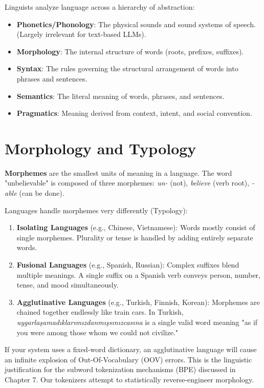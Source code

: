 Linguists analyze language across a hierarchy of abstraction:
\begin{itemize}
    \item \textbf{Phonetics/Phonology}: The physical sounds and sound systems of speech. (Largely irrelevant for text-based LLMs).
    \item \textbf{Morphology}: The internal structure of words (roots, prefixes, suffixes).
    \item \textbf{Syntax}: The rules governing the structural arrangement of words into phrases and sentences.
    \item \textbf{Semantics}: The literal meaning of words, phrases, and sentences.
    \item \textbf{Pragmatics}: Meaning derived from context, intent, and social convention.
\end{itemize}

\section{Morphology and Typology}
\label{ch:05:sec:main}

\textbf{Morphemes} are the smallest units of meaning in a language. The word "unbelievable" is composed of three morphemes: \textit{un-} (not), \textit{believe} (verb root), \textit{-able} (can be done). 

Languages handle morphemes very differently (Typology):
\begin{enumerate}
    \item \textbf{Isolating Languages} (e.g., Chinese, Vietnamese): Words mostly consist of single morphemes. Plurality or tense is handled by adding entirely separate words.
    \item \textbf{Fusional Languages} (e.g., Spanish, Russian): Complex suffixes blend multiple meanings. A single suffix on a Spanish verb conveys person, number, tense, and mood simultaneously.
    \item \textbf{Agglutinative Languages} (e.g., Turkish, Finnish, Korean): Morphemes are chained together endlessly like train cars. In Turkish, \textit{uygarlaşamadıklarımızdanmışsınızcasına} is a single valid word meaning "as if you were among those whom we could not civilize."
\end{enumerate}

If your system uses a fixed-word dictionary, an agglutinative language will cause an infinite explosion of Out-Of-Vocabulary (OOV) errors. This is the linguistic justification for the subword tokenization mechanisms (BPE) discussed in Chapter 7. Our tokenizers attempt to statistically reverse-engineer morphology.

